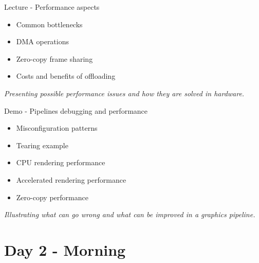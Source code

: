 \documentclass[a4paper,12pt,obeyspaces,spaces,hyphens]{article}
\begin{document}
\feagendatwocolumn
{Lecture - Performance aspects}
{
  \begin{itemize}
  \item Common bottlenecks
  \item DMA operations
  \item Zero-copy frame sharing
  \item Costs and benefits of offloading
  \end{itemize}
  \vspace{0.5em}
  {\em Presenting possible performance issues and how they are solved in hardware.}
}
{Demo - Pipelines debugging and performance}
{
  \begin{itemize}
  \item Misconfiguration patterns
  \item Tearing example
  \item CPU rendering performance
  \item Accelerated rendering performance
  \item Zero-copy performance
  \end{itemize}
  \vspace{0.5em}
  {\em Illustrating what can go wrong and what can be improved in a graphics pipeline.}
}

\section{Day 2 - Morning}
\end{document}
